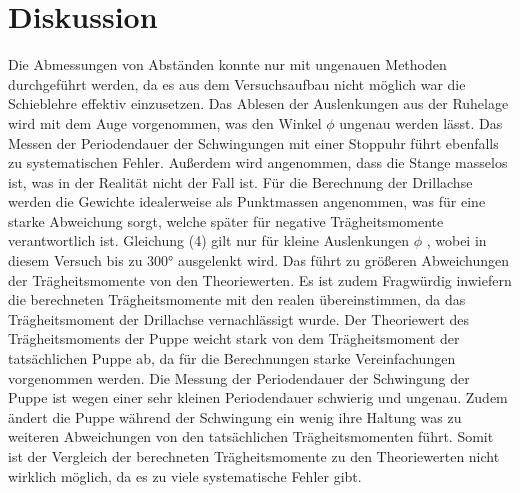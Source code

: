 \section{Diskussion}
\label{sec:Diskussion}
Die Abmessungen von Abständen konnte nur mit ungenauen Methoden durchgeführt werden,
da es aus dem Versuchsaufbau nicht möglich war die Schieblehre effektiv einzusetzen.
Das Ablesen der Auslenkungen aus der Ruhelage wird mit dem Auge vorgenommen, was
den Winkel $\phi$ ungenau werden lässt. Das Messen der Periodendauer der
Schwingungen mit einer Stoppuhr führt ebenfalls zu systematischen Fehler.
Außerdem wird angenommen, dass die Stange masselos ist, was in der Realität
nicht der Fall ist. Für die Berechnung der Drillachse werden die Gewichte idealerweise
als Punktmassen angenommen, was für eine starke Abweichung sorgt, welche später für
negative Trägheitsmomente verantwortlich ist.
Gleichung (4) gilt nur für kleine Auslenkungen $\phi$ , wobei
in diesem Versuch bis zu 300° ausgelenkt wird. Das führt zu größeren Abweichungen
der Trägheitsmomente von den Theoriewerten. Es ist zudem Fragwürdig inwiefern die
berechneten Trägheitsmomente mit den realen übereinstimmen, da das Trägheitsmoment
der Drillachse vernachlässigt wurde.
Der Theoriewert des Trägheitsmoments
der Puppe weicht stark von dem Trägheitsmoment der tatsächlichen Puppe ab, da für die
Berechnungen starke Vereinfachungen vorgenommen werden. Die Messung der Periodendauer
der Schwingung der Puppe ist wegen einer sehr kleinen Periodendauer schwierig und
ungenau. Zudem ändert die Puppe während der Schwingung ein wenig ihre Haltung was zu
weiteren Abweichungen von den tatsächlichen Trägheitsmomenten führt. Somit ist der
Vergleich der berechneten Trägheitsmomente zu den Theoriewerten nicht wirklich
möglich, da es zu viele systematische Fehler gibt.

